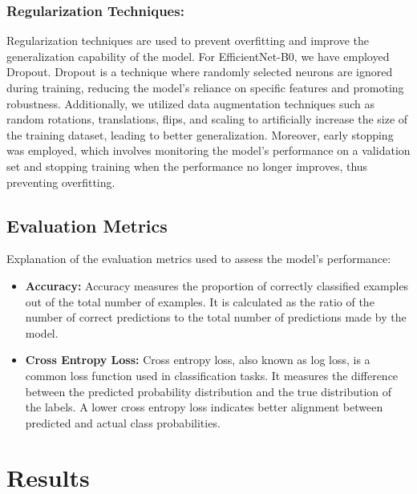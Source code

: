 \documentclass[12pt, a4paper, twoside]{article}
\begin{document}
			\subsubsection{Regularization Techniques:}		
				Regularization techniques are used to prevent overfitting and improve the generalization capability of the model. For EfficientNet-B0, we have employed Dropout. Dropout is a technique where randomly selected neurons are ignored during training, reducing the model's reliance on specific features and promoting robustness. Additionally, we utilized data augmentation techniques such as random rotations, translations, flips, and scaling to artificially increase the size of the training dataset, leading to better generalization. Moreover, early stopping was employed, which involves monitoring the model's performance on a validation set and stopping training when the performance no longer improves, thus preventing overfitting.

		\subsection{Evaluation Metrics}
		Explanation of the evaluation metrics used to assess the model's performance:
		
		\begin{itemize}
			\item \textbf{Accuracy:} Accuracy measures the proportion of correctly classified examples out of the total number of examples. It is calculated as the ratio of the number of correct predictions to the total number of predictions made by the model.
			
			\item \textbf{Cross Entropy Loss:} Cross entropy loss, also known as log loss, is a common loss function used in classification tasks. It measures the difference between the predicted probability distribution and the true distribution of the labels. A lower cross entropy loss indicates better alignment between predicted and actual class probabilities.
		\end{itemize}
		
	\section{Results}
\end{document}
